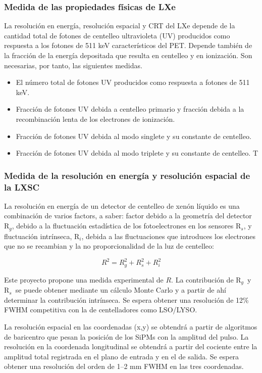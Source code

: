\subsubsection*{Medida de las propiedades físicas de LXe}
La resolución en energía, resolución espacial y CRT del LXe depende de la cantidad total de fotones de centelleo ultravioleta (UV) producidos como respuesta a los fotones de 511 keV característicos del PET. Depende también de la fracción de la energía depositada que resulta en centelleo y en ionización. Son necesarias, por tanto, las siguientes medidas.
\begin{itemize}
\item El número total de fotones UV producidos como respuesta a fotones de 511 keV. 
\item Fracción de fotones UV debida a centelleo primario y fracción debida a la recombinación lenta de los electrones de ionización. 
\item Fracción de fotones UV debida al modo singlete y su constante de centelleo.
\item Fracción de fotones UV debida al modo triplete y su constante de centelleo. 
T\end{itemize}

\subsubsection*{Medida de la resolución en energía y resolución espacial de la LXSC}

La resolución en energía de un detector de centelleo de xenón líquido es una combinación de varios factors, a saber: factor debido a la geometría del detector R$_g$, debido a la fluctuación estadística de los fotoelectrones en los sensores R$_s$, y fluctuación intrínseca, R$_i$, debida a las fluctuaciones que introduces los electrones que no se recambian y la no proporcionalidad de la luz de centelleo:

\begin{equation}
R^2 = R_g^2 + R_s^2 +  R_i^2
\end{equation}

Este proyecto propone una medida experimental de $R$. La contribución de 
R$_g$~y R$_s$~se puede obtener mediante un cálculo Monte Carlo y a partir de ahí determinar la contribución intrínseca. Se espera obtener una resolución de 12\% FWHM competitiva con la de centelladores como LSO/LYSO. 

La resolución espacial en las coordenadas (x,y) se obtendrá a partir de algoritmos de baricentro que pesan la posición de los SiPMs con la amplitud del pulso. La resolución en la coordenada longitudinal se obtendrá a partir del cociente entre la amplitud total registrada en el plano de entrada y en el de salida. Se espera obtener una resolución del orden de 1--2 mm FWHM en las tres coordenadas.     

